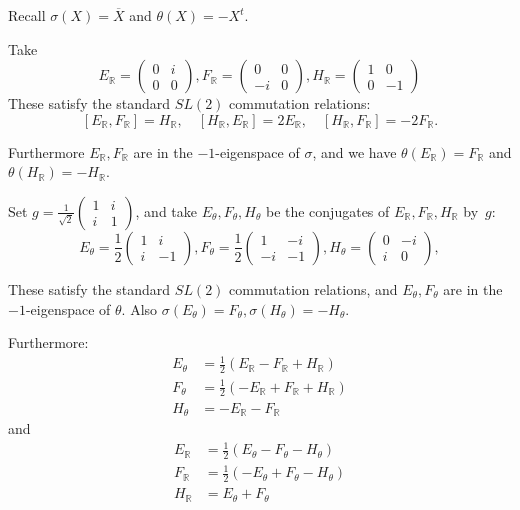\documentclass[10pt,leqno]{article}
\newcommand{\R}{\mathbb R}
\begin{document}
Recall $\sigma(X)=\overline X$ and $\theta(X)=-X^t$.

Take
$$
E_\R=\begin{pmatrix}0&i\\0&0\end{pmatrix},
F_\R=\begin{pmatrix}0&0\\-i&0\end{pmatrix},
H_\R=\begin{pmatrix}1&0\\0&-1\end{pmatrix}
$$
These satisfy the standard $SL(2)$ commutation relations: 
\[ [E_\R, F_\R] = H_\R, \quad [H_\R, E_\R] = 2E_\R, \quad [H_\R, F_\R] = -2F_\R. \]

Furthermore $E_\R,F_\R$ are in the $-1$-eigenspace of $\sigma$,
and  we have $\theta(E_\R)=F_\R$ and $\theta(H_\R)=-H_\R$.

Set $g=\frac 1{\sqrt 2}\begin{pmatrix}1&i\\i&1
\end{pmatrix}$, and take $E_\theta,F_\theta,H_\theta$ be the conjugates of $E_\R,F_\R,H_\R$ by~$g$:
$$
E_\theta=\frac12\begin{pmatrix}1&i\\i&-1\end{pmatrix},
F_\theta=\frac12\begin{pmatrix}1&-i\\-i&-1\end{pmatrix},
H_\theta=\begin{pmatrix}0&-i\\i&0\end{pmatrix},
$$


These satisfy the standard $SL(2)$ commutation relations, and $E_\theta,F_\theta$ are in the $-1$-eigenspace of $\theta$.
Also $\sigma(E_\theta)=F_\theta,\sigma(H_\theta)=-H_\theta$.

Furthermore:
$$
\begin{aligned}
  E_\theta&=\frac12(E_\R-F_\R+H_\R)\\
  F_\theta&=\frac12(-E_\R+F_\R+H_\R)\\
  H_\theta&=-E_\R-F_\R
\end{aligned}
$$
and
$$
\begin{aligned}
  E_\R&=\frac12(E_\theta-F_\theta-H_\theta)\\
  F_\R&=\frac12(-E_\theta+F_\theta-H_\theta)\\
  H_\R&=E_\theta+F_\theta
\end{aligned}
$$





\end{document}
